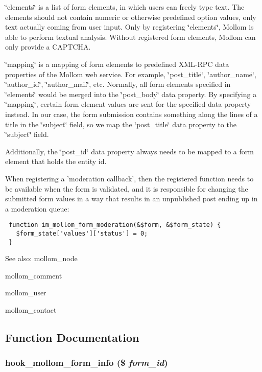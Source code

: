 \char`\"{}elements\char`\"{} is a list of form elements, in which users can freely type text. The elements should not contain numeric or otherwise predefined option values, only text actually coming from user input. Only by registering \char`\"{}elements\char`\"{}, Mollom is able to perform textual analysis. Without registered form elements, Mollom can only provide a CAPTCHA.

\char`\"{}mapping\char`\"{} is a mapping of form elements to predefined XML-RPC data properties of the Mollom web service. For example, \char`\"{}post\_\-title\char`\"{}, \char`\"{}author\_\-name\char`\"{}, \char`\"{}author\_\-id\char`\"{}, \char`\"{}author\_\-mail\char`\"{}, etc. Normally, all form elements specified in \char`\"{}elements\char`\"{} would be merged into the \char`\"{}post\_\-body\char`\"{} data property. By specifying a \char`\"{}mapping\char`\"{}, certain form element values are sent for the specified data property instead. In our case, the form submission contains something along the lines of a title in the \char`\"{}subject\char`\"{} field, so we map the \char`\"{}post\_\-title\char`\"{} data property to the \char`\"{}subject\char`\"{} field.

Additionally, the \char`\"{}post\_\-id\char`\"{} data property always needs to be mapped to a form element that holds the entity id.

When registering a 'moderation callback', then the registered function needs to be available when the form is validated, and it is responsible for changing the submitted form values in a way that results in an unpublished post ending up in a moderation queue: 

\begin{Code}\begin{verbatim} function im_mollom_form_moderation(&$form, &$form_state) {
   $form_state['values']['status'] = 0;
 }
\end{verbatim}
\end{Code}



\begin{Desc}
\item[See also:]mollom\_\-node 

mollom\_\-comment 

mollom\_\-user 

mollom\_\-contact \end{Desc}


\subsection{Function Documentation}
\hypertarget{group__mollom__api_ga5150fd4fabe048cbdeb41ec10908658}{
\subsubsection[{hook\_\-mollom\_\-form\_\-info}]{\setlength{\rightskip}{0pt plus 5cm}hook\_\-mollom\_\-form\_\-info (\$ {\em form\_\-id})}}
\label{group__mollom__api_ga5150fd4fabe048cbdeb41ec10908658}


